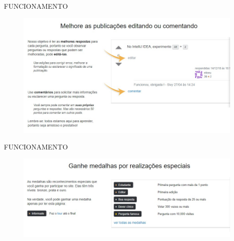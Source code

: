 \documentclass{Alexandre}
\begin{document}
\begin{frame}{FUNCIONAMENTO}

    \begin{figure}
        \includegraphics[scale = 0.4]{Figuras/StackOverflow-Edicao.jpg}
    \end{figure}

\end{frame}


\begin{frame}{FUNCIONAMENTO}

    \begin{figure}
        \includegraphics[scale = 0.45]{Figuras/StackOverflow-Recompensas.jpg}
    \end{figure}

\end{frame}
\end{document}

